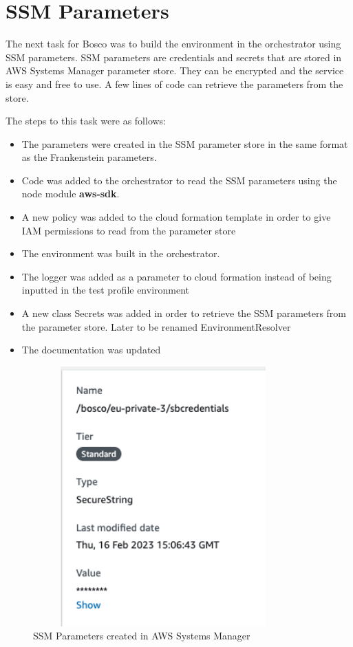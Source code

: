 \documentclass[12pt,a4paper,titlepage]{report}
\begin{document}
\section{SSM Parameters}
The next task for Bosco was to build the environment in the orchestrator using SSM parameters. 
SSM parameters are credentials and secrets that are stored in AWS Systems Manager parameter store. 
They can be encrypted and the service is easy and free to use. A few lines of code can retrieve the parameters from the store. 

The steps to this task were as follows:
\begin{itemize}
\item The parameters were created in the SSM parameter store in the same format as the Frankenstein parameters.
\item Code was added to the orchestrator to read the SSM parameters using the node module \textbf{aws-sdk}.
\item A new policy was added to the cloud formation template in order to give IAM permissions to read from the parameter store
\item The environment was built in the orchestrator.
\item The logger was added as a parameter to cloud formation instead of being inputted in the test profile environment
\item A new class Secrets was added in order to retrieve the SSM parameters from the parameter store. Later to be renamed EnvironmentResolver
\item The documentation was updated
\end{itemize}

\begin{figure}[h]
  \centering
  \includegraphics[width=10cm,height=10cm,keepaspectratio]{./diagrams/ssm_params.png}
  \caption{SSM Parameters created in AWS Systems Manager}
\end{figure}
\end{document}
